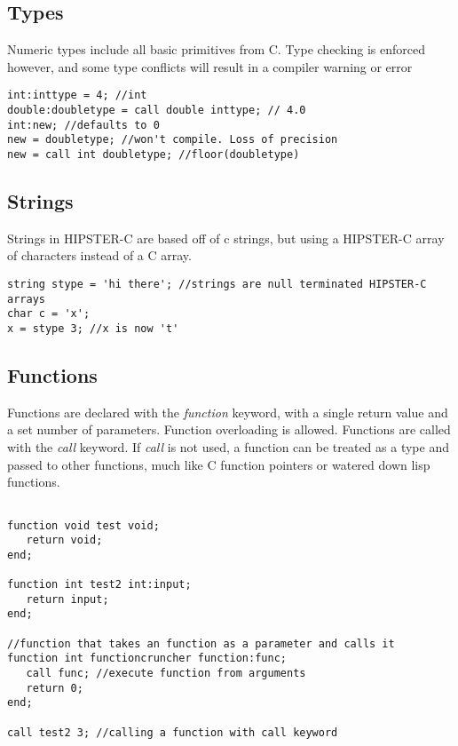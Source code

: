 \documentclass{article}
\begin{document}
\subsection{Types}
Numeric types include all basic primitives from C. Type checking is enforced however, and some type conflicts will result in a compiler warning or error
\begin{verbatim}
int:inttype = 4; //int
double:doubletype = call double inttype; // 4.0 
int:new; //defaults to 0 
new = doubletype; //won't compile. Loss of precision
new = call int doubletype; //floor(doubletype) 
\end{verbatim}


\subsection{Strings}
Strings in HIPSTER-C are based off of c strings, but using a HIPSTER-C array of characters instead of a C array. 
\begin{verbatim}
string stype = 'hi there'; //strings are null terminated HIPSTER-C arrays
char c = 'x';
x = stype 3; //x is now 't'
\end{verbatim}


\subsection{Functions}
Functions are declared with the \textit{function} keyword, with a single return value and a set number of parameters. Function overloading is allowed. Functions are called with the \textit{call} keyword. If \textit{call} is not used, a function can be treated as a type and passed to other functions, much like C function pointers or watered down lisp functions. 
\begin{verbatim}

function void test void; 
   return void;
end;

function int test2 int:input; 
   return input;
end;

//function that takes an function as a parameter and calls it
function int functioncruncher function:func;
   call func; //execute function from arguments 
   return 0;
end; 

call test2 3; //calling a function with call keyword
\end{verbatim}
\end{document}
